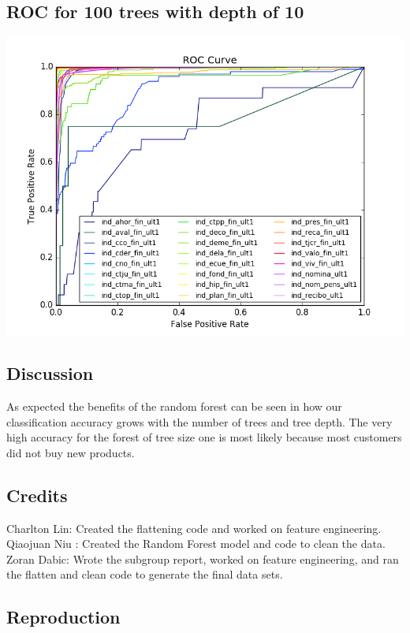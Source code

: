 \documentclass[10pt]{article}
\begin{document}
\subsection{ROC for 100 trees with depth of 10}
\begin{center}
\includegraphics[width = 15cm]{ROC.png}
\end{center}

\subsection{Discussion}

As expected the benefits of the random forest can be seen in how our classification accuracy grows with the number of trees and tree depth. The very high accuracy for the forest of tree size one is most likely because most customers did not buy new products.


\subsection{Credits}

Charlton Lin: Created the flattening code and worked on feature engineering.
Qiaojuan Niu : Created the Random Forest model and code to clean the data.
Zoran Dabic: Wrote the subgroup report, worked on feature engineering, and ran the flatten and clean code to generate the final data sets.

\subsection{Reproduction}
\end{document}
